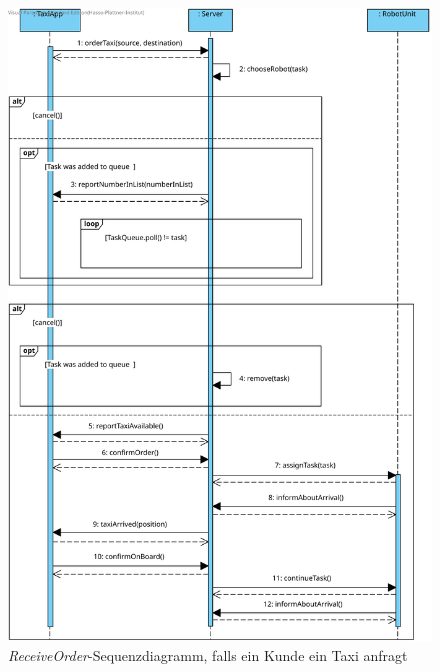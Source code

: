 \begin{figure}[H]
	\centering
	\includegraphics[width=1\textwidth]{img/2-Entwurf-ReceiveOrder-Taxi}
	\caption{\emph{ReceiveOrder}-Sequenzdiagramm, falls ein Kunde ein Taxi anfragt}
	\label{SequenzDiagrammInteraktionTaxi}
\end{figure}

